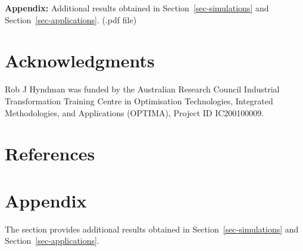 \documentclass[
  11pt]{article}
\begin{document}
\textbf{Appendix:} Additional results obtained in
Section~\ref{sec-simulations} and Section~\ref{sec-applications}. (.pdf
file)

\hypertarget{acknowledgments}{%
\section*{Acknowledgments}\label{acknowledgments}}

Rob J Hyndman was funded by the Australian Research Council Industrial
Transformation Training Centre in Optimisation Technologies, Integrated
Methodologies, and Applications (OPTIMA), Project ID IC200100009.

\hypertarget{references}{%
\section*{References}\label{references}}

\renewcommand{\bibsection}{}


\newpage
\appendix
{}%
\setcounter{section}{0}
\renewcommand{\thesection}{\Alph{section}}
\renewcommand{\thefigure}{A\arabic{figure}}
\renewcommand{\thetable}{A\arabic{table}}
\setcounter{figure}{0}
\setcounter{table}{0}

\hypertarget{appendix}{%
\section*{Appendix}\label{appendix}}

The section provides additional results obtained in
Section~\ref{sec-simulations} and Section~\ref{sec-applications}.
\end{document}
